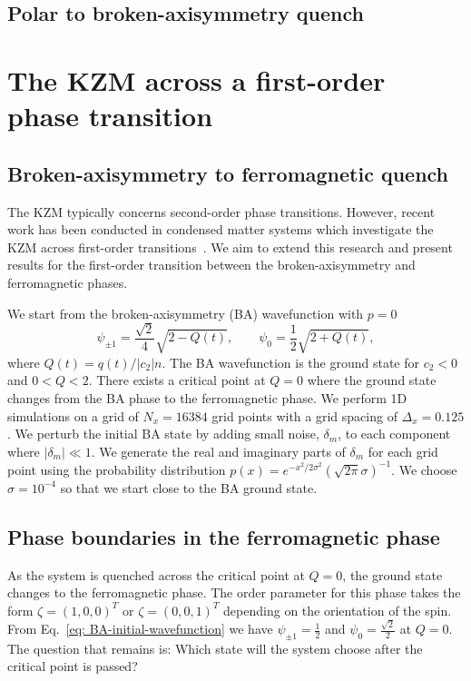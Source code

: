\subsection{Polar to broken-axisymmetry quench}

\section{The KZM across a first-order phase transition}
\subsection{Broken-axisymmetry to ferromagnetic quench}
The KZM typically concerns second-order phase transitions. However, recent
work has been conducted in condensed matter systems which investigate
the KZM across first-order transitions~\cite{Qiu2020}.
We aim to extend this research and present results for
the first-order transition between the broken-axisymmetry and
ferromagnetic phases.

We start from the broken-axisymmetry (BA) wavefunction with $p=0$
\begin{equation}
    \psi_{\pm 1} = \frac{\sqrt{2}}{4}\sqrt{2 - Q(t)}, \qquad
    \psi_0 = \frac{1}{2}\sqrt{2 + Q(t)},
    \label{eq: BA-initial-wavefunction}
\end{equation}
where $Q(t)=q(t)/|c_2|n$.
The BA wavefunction is the ground state for $c_2 < 0$ and $0 < Q < 2$.
There exists a critical point at $Q=0$ where the ground state changes from
the BA phase to the ferromagnetic phase.
We perform 1D simulations on a grid of $N_x = 16384$ grid points with a grid
spacing of $\Delta_x = 0.125$.
We perturb the initial BA state by adding small noise, $\delta_m$, to each
component where $|\delta_m| \ll 1$.
We generate the real and imaginary parts of $\delta_m$ for each grid point
using the probability distribution
$p(x) = e^{-x^2/2\sigma^2}(\sqrt{2\pi}\sigma)^{-1}$.
We choose $\sigma=10^{-4}$ so that we start close to the BA ground state.

\subsection{Phase boundaries in the ferromagnetic phase}
As the system is quenched across the critical point at $Q=0$, the ground state
changes to the ferromagnetic phase.
The order parameter for this phase takes the form $\zeta=(1,0,0)^T$ or 
$\zeta=(0,0,1)^T$ depending on the orientation of the spin.
From Eq.~\eqref{eq: BA-initial-wavefunction} we have
$\psi_{\pm 1} = \frac{1}{2}$ and $\psi_0 = \frac{\sqrt{2}}{2}$ at $Q=0$.
The question that remains is: Which state will the system choose after
the critical point is passed?

